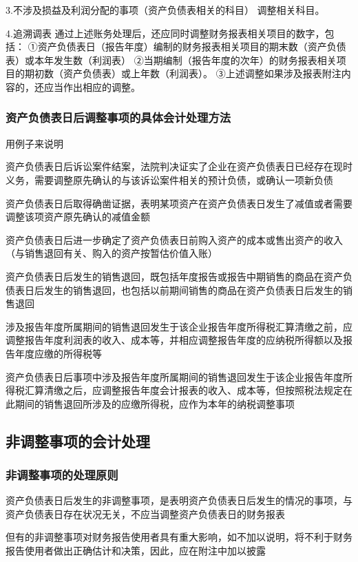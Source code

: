 \documentclass[UTF8,12pt]{ctexart}
\numberwithin{equation}{section} %
\numberwithin{figure}{section}
\numberwithin{table}{section}
\begin{document}
	3.不涉及损益及利润分配的事项（资产负债表相关的科目）
	调整相关科目。
	
	4.追溯调表
	通过上述账务处理后，还应同时调整财务报表相关项目的数字，包括：
	①资产负债表日（报告年度）编制的财务报表相关项目的期末数（资产负债表）或本年发生数（利润表）
	②当期编制（报告年度的次年）的财务报表相关项目的期初数（资产负债表）或上年数（利润表）。
	③上述调整如果涉及报表附注内容的，还应当作出相应的调整。
	
	\subsubsection{资产负债表日后调整事项的具体会计处理方法}
	用例子来说明
	
	资产负债表日后诉讼案件结案，法院判决证实了企业在资产负债表日已经存在现时义务，需要调整原先确认的与该诉讼案件相关的预计负债，或确认一项新负债
	
	资产负债表日后取得确凿证据，表明某项资产在资产负债表日发生了减值或者需要调整该项资产原先确认的减值金额
	
	资产负债表日后进一步确定了资产负债表日前购入资产的成本或售出资产的收入（与销售退回有关、购入的资产按暂估价值入账）
	
	资产负债表日后发生的销售退回，既包括年度报告或报告中期销售的商品在资产负债表日后发生的销售退回，也包括以前期间销售的商品在资产负债表日后发生的销售退回
	
	涉及报告年度所属期间的销售退回发生于该企业报告年度所得税汇算清缴之前，应调整报告年度利润表的收入、成本等，并相应调整报告年度的应纳税所得额以及报告年度应缴的所得税等
	
	资产负债表日后事项中涉及报告年度所属期间的销售退回发生于该企业报告年度所得税汇算清缴之后，应调整报告年度会计报表的收入、成本等，但按照税法规定在此期间的销售退回所涉及的应缴所得税，应作为本年的纳税调整事项

	
	\subsection{非调整事项的会计处理}
	\subsubsection{非调整事项的处理原则}
	资产负债表日后发生的非调整事项，是表明资产负债表日后发生的情况的事项，与资产负债表日存在状况无关，不应当调整资产负债表日的财务报表
	
	但有的非调整事项对财务报告使用者具有重大影响，如不加以说明，将不利于财务报告使用者做出正确估计和决策，因此，应在附注中加以披露
	
\end{document}
